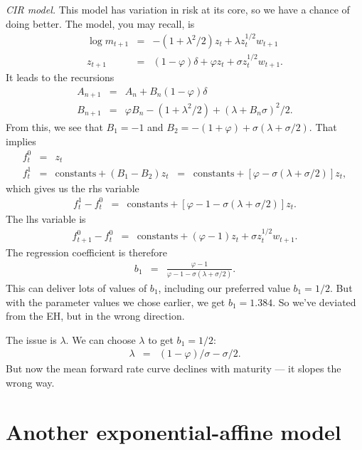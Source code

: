 \documentclass[11pt]{article}
\begin{document}
{\it CIR model.\/}
This model has variation in risk at its core,
so we have a chance of doing better.
The model, you may recall,
is
\begin{eqnarray*}
    \log m_{t+1} &=& - (1+\lambda^2/2 ) z_t + \lambda z_t^{1/2} w_{t+1} \nonumber \\
         z_{t+1} &=& (1-\varphi) \delta + \varphi z_t + \sigma z_t^{1/2} w_{t+1} .
         \label{eq:square-root}
\end{eqnarray*}
It leads to the recursions
\begin{eqnarray*}
    A_{n+1} &=& A_n + B_n (1-\varphi) \delta \\
    B_{n+1} &=& \varphi B_n -(1+\lambda^2/2) + (\lambda + B_n \sigma)^2/2 .
\end{eqnarray*}
From this, we see that $B_1 = -1$ and $B_2 = -(1+\varphi) + \sigma(\lambda + \sigma/2)$.
That implies
\begin{eqnarray*}
    f^0_t &=& z_t \\
    f^1_t &=& \mbox{constants} + (B_1-B_2) z_t
            \;\;=\;\; \mbox{constants} + [\varphi-\sigma(\lambda+\sigma/2)] z_t ,
\end{eqnarray*}
which gives us the rhs variable
\begin{eqnarray*}
    f^1_t - f^0_t &=& \mbox{constants} + [\varphi-1-\sigma(\lambda+\sigma/2)] z_t .
\end{eqnarray*}
The lhs variable is
\begin{eqnarray*}
    f^0_{t+1} - f^0_t &=&  \mbox{constants} + (\varphi-1) z_t + \sigma z_t^{1/2} w_{t+1}.
\end{eqnarray*}
The regression coefficient is therefore
\begin{eqnarray*}
    b_1 &=& \frac{\varphi-1}{\varphi-1-\sigma(\lambda+\sigma/2)} .
\end{eqnarray*}
This can deliver lots of values of $b_1$, including our preferred value $b_1 = 1/2$.
But with the parameter values we chose earlier, we get $b_1 = 1.384$.
So we've deviated from the EH, but in the wrong direction.

The issue is $\lambda$.  We can choose $\lambda$ to get $b_1 = 1/2$:
\begin{eqnarray*}
    \lambda &=& (1-\varphi)/\sigma - \sigma/2 .
\end{eqnarray*}
But now the mean forward rate curve declines with maturity ---
it slopes the wrong way.



\section{Another exponential-affine model}
\end{document}
